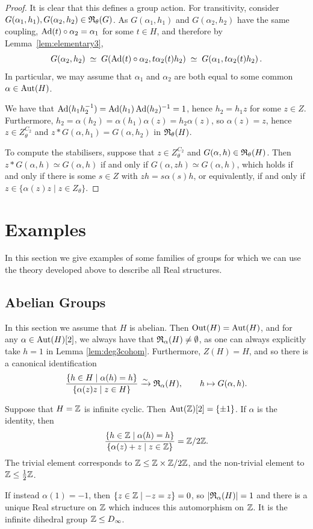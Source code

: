 \begin{proof}
  It is clear that this defines a group action. For transitivity, consider $G(\alpha_1, h_1),G(\alpha_2, h_2)\in {\mathfrak R}_{\theta}(G)$. As $G(\alpha_1, h_1)$ and $G(\alpha_2, h_2)$ have the same coupling, $\operatorname{Ad}(t) \circ \alpha_2 = \alpha_1$ for some $t \in H$, and therefore by Lemma~\ref{lem:elementary3},
    \[
    G(\alpha_2, h_2) \;\simeq\; G(\operatorname{Ad}(t) \circ \alpha_2, t \alpha_2(t)h_2) \;\simeq\; G(\alpha_1, t \alpha_2(t) h_2) \, .
    \]
    In particular, we may assume that $\alpha_1$ and $\alpha_2$ are both equal to some common $\alpha \in \operatorname{Aut}(H)$. 

    We have that $\operatorname{Ad}(h_1h_2^{-1}) = \operatorname{Ad}(h_1) \operatorname{Ad}(h_2)^{-1} = 1$, hence $h_2 = h_1 z$ for some $z \in Z$. Furthermore, $h_2 = \alpha(h_2) = \alpha(h_1) \alpha(z) = h_2 \alpha(z)$, so $\alpha(z) = z$, hence $z \in Z_{\theta}^{C_2}$ and $z * G(\alpha, h_1) = G(\alpha, h_2)$ in ${\mathfrak R}_{\theta}(H)$.

    To compute the stabilisers, suppose that $z \in Z_{\theta}^{C_2}$ and $G(\alpha, h) \in {\mathfrak R}_{\theta}(H)$. Then $z *  G(\alpha, h) \simeq G(\alpha, h)$ if and only if $G(\alpha, zh) \simeq G(\alpha, h)$, which holds if and only if there is some $s \in Z$ with $zh = s \alpha(s) h$, or equivalently, if and only if $z \in \{\alpha(z)z \mid z \in Z_{\theta}\}$.
\end{proof}

\section{Examples}

In this section we give examples of some families of groups for which we can use the theory developed above to describe all Real structures.

\subsection{Abelian Groups}\label{sect:realstrabgroups}

In this section we assume that $H$ is abelian. Then $\operatorname{Out}(H) = \operatorname{Aut}(H)$, and for any $\alpha \in \operatorname{Aut}(H)[2]$, we always have that ${\mathfrak R}_{\alpha}(H) \neq \emptyset$, as one can always explicitly take $h = 1$ in Lemma \ref{lem:deg3cohom}. Furthermore, $Z(H) = H$, and so there is a canonical identification
\[
  \frac{\{h \in H \mid \alpha(h) = h\}}{\{\alpha(z)z \mid z \in H\}} \xrightarrow{\sim} {\mathfrak R}_{\alpha}(H), \qquad h \mapsto G(\alpha, h).
\]

\begin{eg}
Suppose that $H = {\mathbb Z}$ is infinite cyclic. Then $\operatorname{Aut}({\mathbb Z})[2] = \{\pm 1\}$. If $\alpha$ is the identity, then 
\[
\frac{\{h \in {\mathbb Z} \mid \alpha(h) = h\}}{\{\alpha(z) + z \mid z \in {\mathbb Z}\}} = {\mathbb Z} / 2 {\mathbb Z}.
\]
The trivial element corresponds to ${\mathbb Z} \leq {\mathbb Z} \times {\mathbb Z} / 2 {\mathbb Z}$, and the non-trivial element to ${\mathbb Z} \leq \frac{1}{2}{\mathbb Z}$.

If instead $\alpha(1) = -1$, then $\{z \in {\mathbb Z} \mid -z = z\} = 0$, so $|{\mathfrak R}_{\alpha}(H)| = 1$ and there is a unique Real structure on ${\mathbb Z}$ which induces this automorphism on ${\mathbb Z}$. It is the infinite dihedral group ${\mathbb Z} \leq D_{\infty}$.
\end{eg}

